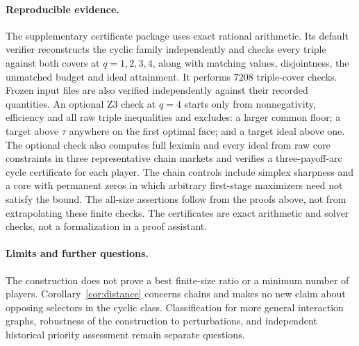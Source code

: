 \documentclass[11pt]{article}
\theoremstyle{remark}\newtheorem{remark}[theorem]{Remark}
\begin{document}
\paragraph{Reproducible evidence.}
The supplementary certificate package uses exact rational arithmetic.
Its default verifier reconstructs the cyclic family independently and
checks every triple against both covers at $q=1,2,3,4$, along with
matching values, disjointness, the unmatched budget and ideal attainment.
It performs $7208$ triple-cover checks. Frozen input files are also
verified independently against their recorded quantities. An optional
Z3 check at $q=4$ starts only from nonnegativity, efficiency and all raw
triple inequalities and excludes: a larger common floor; a target above
$\tau$ anywhere on the first optimal face; and a target ideal above one.
The optional check also computes full leximin and every ideal from raw
core constraints in three representative chain markets and verifies a
three-payoff-arc cycle certificate for each player.
The chain controls include simplex sharpness and a core with permanent
zeros in which arbitrary first-stage maximizers need not satisfy the
bound. The all-size assertions follow from the proofs above, not from
extrapolating these finite checks. The certificates are exact arithmetic
and solver checks, not a formalization in a proof assistant.

\paragraph{Limits and further questions.}
The construction does not prove a best finite-size ratio or a minimum
number of players. Corollary~\ref{cor:distance} concerns chains and makes
no new claim about opposing selectors in the cyclic class. Classification
for more general interaction graphs, robustness of the construction to
perturbations, and independent historical priority assessment remain
separate questions.
\end{document}
